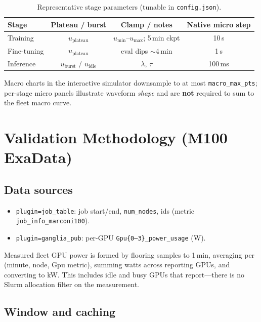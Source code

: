 \documentclass[10pt,a4paper,twocolumn]{article}
\begin{document}
\begin{table}[H]
\centering
\caption{Representative stage parameters (tunable in \texttt{config.json}).}
\label{tab:stages}
\small
\renewcommand{\arraystretch}{1.15}
\begin{tabular}{lccc}
\toprule
Stage & Plateau / burst & Clamp / notes & Native micro step \\
\midrule
Training & $u_{\mathrm{plateau}}$ & $u_{\min}$--$u_{\max}$; 5\,min ckpt & 10\,s \\
Fine-tuning & $u_{\mathrm{plateau}}$ & eval dips $\sim$4\,min & 1\,s \\
Inference & $u_{\mathrm{burst}}$ / $u_{\mathrm{idle}}$ & $\lambda$, $\tau$ & 100\,ms \\
\bottomrule
\end{tabular}
\end{table}

\noindent Macro charts in the interactive simulator downsample to at most
\texttt{macro\_max\_pts}; per-stage micro panels illustrate waveform
\emph{shape} and are \textbf{not} required to sum to the fleet macro curve.

\section{Validation Methodology (M100 ExaData)}
\label{sec:validation}

\subsection{Data sources}

\begin{itemize}[leftmargin=1.2em,itemsep=1pt,topsep=2pt]
  \item \texttt{plugin=job\_table}: job start/end, \texttt{num\_nodes}, ids
        (metric \texttt{job\_info\_marconi100}).
  \item \texttt{plugin=ganglia\_pub}: per-GPU
        \texttt{Gpu\{0--3\}\_power\_usage} (W).
\end{itemize}
Measured fleet GPU power is formed by flooring samples to 1\,min, averaging
per (minute, node, Gpu metric), summing watts across reporting GPUs, and
converting to kW. This includes idle and busy GPUs that report---there is no
Slurm allocation filter on the measurement.

\subsection{Window and caching}
\end{document}
